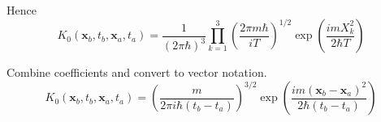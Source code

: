 Hence
\begin{equation*}
K_0(\mathbf x_b,t_b,\mathbf x_a,t_a)=
\frac{1}{(2\pi\hbar)^3}
\prod_{k=1}^3
\left(\frac{2\pi m\hbar}{iT}\right)^{1/2}
\exp\left(\frac{imX_k^2}{2\hbar T}\right)
\end{equation*}

Combine coefficients and convert to vector notation.
\begin{equation*}
K_0(\mathbf x_b,t_b,\mathbf x_a,t_a)=
\left(\frac{m}{2\pi i\hbar(t_b-t_a)}\right)^{3/2}
\exp\left(\frac{im(\mathbf x_b-\mathbf x_a)^2}{2\hbar(t_b-t_a)}\right)
\tag{2}
\end{equation*}


